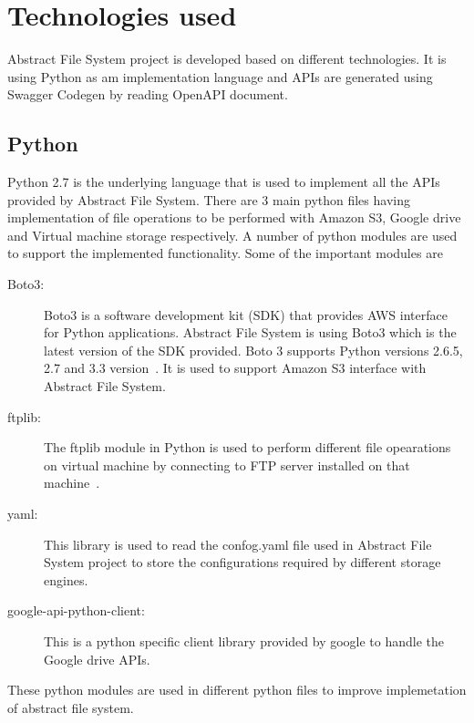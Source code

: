 \section{Technologies used}

Abstract File System project is developed based on different 
technologies. It is using Python as am implementation language 
and APIs are generated using Swagger Codegen by reading 
OpenAPI document.

\subsection{Python}

Python 2.7 is the underlying language that is used to implement all
the APIs provided by Abstract File System.  There are 3 main python
files having implementation of file operations to be performed with
Amazon S3, Google drive and Virtual machine storage respectively. A
number of python modules are used to support the implemented
functionality. Some of the important modules are

\begin{description}

\item[Boto3:] Boto3 is a software development kit (SDK) that provides
  AWS interface for Python applications. Abstract File System is using
  Boto3 which is the latest version of the SDK provided. Boto 3
  supports Python versions 2.6.5, 2.7 and 3.3
  version~\cite{hid-sp18-420-boto}.  It is used to support Amazon S3
  interface with Abstract File System.

\item[ftplib:] The ftplib module in Python is used to perform
  different file opearations on virtual machine by connecting to FTP
  server installed on that machine~\cite{hid-sp18-420-FTP}.

\item[yaml:] This library is used to read the confog.yaml file used in
  Abstract File System project to store the configurations required by
  different storage engines.

\item[google-api-python-client:] This is a python specific client
  library provided by google to handle the Google drive APIs.

\end{description}

These python modules are used in different python files to improve 
implemetation of abstract file system.

